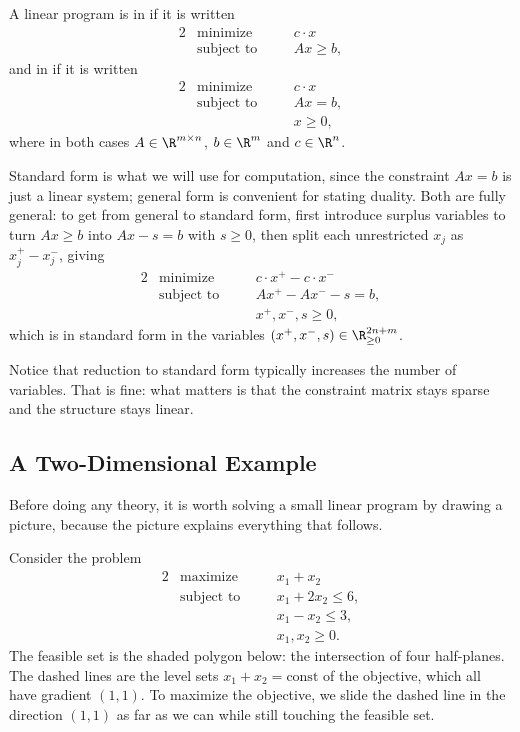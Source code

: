 \documentclass[a4paper]{scrartcl}
\begin{document}
\begin{definition}
    A linear program is in  if it is written
    \begin{alignat*}{2}
        & \text{minimize} \quad && c \cdot x \\
        & \text{subject to} \quad && Ax \geq b,
    \end{alignat*}
    and in  if it is written
    \begin{alignat*}{2}
        & \text{minimize} \quad && c \cdot x \\
        & \text{subject to} \quad && Ax = b, \\
        & && x \geq 0,
    \end{alignat*}
    where in both cases $A \in \R^{m\times n}$, $b \in \R^m$ and $c \in \R^n$.
\end{definition}

Standard form is what we will use for computation, since the constraint $Ax = b$ is just a linear system; general form is convenient for stating duality. Both are fully general: to get from general to standard form, first introduce surplus variables to turn $Ax \geq b$ into $Ax - s = b$ with $s \geq 0$, then split each unrestricted $x_j$ as $x_j^+ - x_j^-$, giving
\begin{alignat*}{2}
    & \text{minimize} \quad && c\cdot x^+ - c\cdot x^- \\
    & \text{subject to} \quad && Ax^+ - Ax^- - s = b, \\
    & && x^+, x^-, s \geq 0,
\end{alignat*}
which is in standard form in the variables $(x^+, x^-, s) \in \R^{2n + m}_{\geq 0}$.

Notice that reduction to standard form typically increases the number of variables. That is fine: what matters is that the constraint matrix stays sparse and the structure stays linear.

\subsection{A Two-Dimensional Example}

Before doing any theory, it is worth solving a small linear program by drawing a picture, because the picture explains everything that follows.

\begin{example}
    Consider the problem
    \begin{alignat*}{2}
        & \text{maximize} \quad && x_1 + x_2 \\
        & \text{subject to} \quad && x_1 + 2x_2 \leq 6, \\
        & && x_1 - x_2 \leq 3,\\
        & && x_1, x_2 \geq 0.
    \end{alignat*}
    The feasible set is the shaded polygon below: the intersection of four half-planes. The dashed lines are the level sets $x_1 + x_2 = \text{const}$ of the objective, which all have gradient $(1,1)$. To maximize the objective, we slide the dashed line in the direction $(1,1)$ as far as we can while still touching the feasible set.
\end{example}
\end{document}
